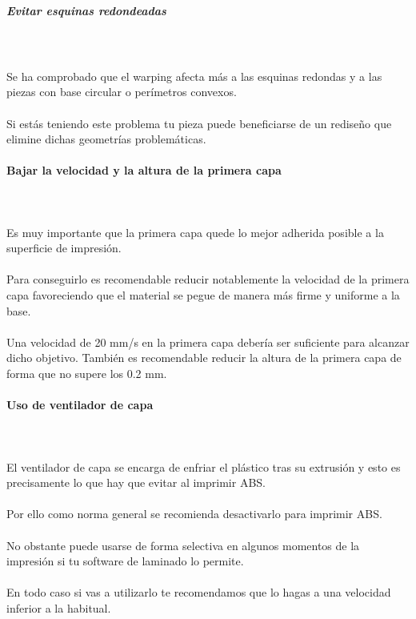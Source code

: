 \documentclass[11pt,a4paper]{article}
\begin{document}
				\subparagraph{Evitar esquinas redondeadas}\mbox{}\\\\
Se ha comprobado que el warping afecta más a las esquinas redondas y a las piezas con base circular o perímetros convexos.
\\\\
Si estás teniendo este problema tu pieza puede beneficiarse de un rediseño que elimine dichas geometrías problemáticas.
			\paragraph{Bajar la velocidad y la altura de la primera capa}\mbox{}\\\\
Es muy importante que la primera capa quede lo mejor adherida posible a la superficie de impresión.
\\\\
Para conseguirlo es recomendable reducir notablemente la velocidad de la primera capa favoreciendo que el material se pegue de manera más firme y uniforme a la base.
\\\\
Una velocidad de 20 mm/s en la primera capa debería ser suficiente para alcanzar dicho objetivo. También es recomendable reducir la altura de la primera capa de forma que no supere los 0.2 mm.
			\paragraph{Uso de ventilador de capa}\mbox{}\\\\
El ventilador de capa se encarga de enfriar el plástico tras su extrusión y esto es precisamente lo que hay que evitar al imprimir ABS.
\\\\
Por ello como norma general se recomienda desactivarlo para imprimir ABS.
\\\\
No obstante puede usarse de forma selectiva en algunos momentos de la impresión si tu software de laminado lo permite.
\\\\
En todo caso si vas a utilizarlo te recomendamos que lo hagas a una velocidad inferior a la  habitual.
\end{document}

